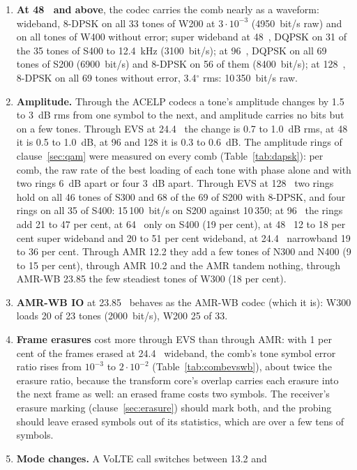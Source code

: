 \begin{enumerate}[label=\alph*)]
  band).
\item \textbf{At 48~\kbs{} and above}, the codec carries the comb
  nearly as a waveform: wideband, 8-DPSK on all 33 tones of W200 at
  $3 \cdot 10^{-3}$ (4950~bit/s raw) and on all tones of W400 without
  error; super wideband at 48~\kbs{}, DQPSK on 31 of the 35 tones of S400
  to 12.4~kHz (3100~bit/s); at 96~\kbs{}, DQPSK on all 69 tones of S200
  (6900~bit/s) and 8-DPSK on 56 of them (8400~bit/s); at 128~\kbs{},
  8-DPSK on all 69 tones without error, 3.4$^\circ$ rms: 10\,350~bit/s raw.
\item \textbf{Amplitude.}  Through the ACELP codecs a tone's amplitude
  changes by 1.5 to 3~dB rms from one symbol to the next, and amplitude
  carries no bits but on a few tones.  Through EVS at 24.4~\kbs{} the
  change is 0.7 to 1.0~dB rms, at 48 it is 0.5 to 1.0~dB, at 96 and 128
  it is 0.3 to 0.6~dB.  The amplitude rings of clause~\ref{sec:qam} were
  measured on every comb (Table~\ref{tab:dapsk}): per comb, the raw rate
  of the best loading of each tone with phase alone and with two rings
  6~dB apart or four 3~dB apart.  Through EVS at 128~\kbs{} two rings
  hold on all 46 tones of S300 and 68 of the 69 of S200 with 8-DPSK, and
  four rings on all 35 of S400: 15\,100~bit/s on S200 against 10\,350;
  at 96~\kbs{} the rings add 21 to 47 per cent, at 64~\kbs{} only on
  S400 (19 per cent), at 48~\kbs{} 12 to 18 per cent super wideband and
  20 to 51 per cent wideband, at 24.4~\kbs{} narrowband 19 to 36 per
  cent.  Through AMR 12.2 they add a few tones of N300 and N400 (9 to 15 per
  cent), through AMR 10.2 and the AMR tandem nothing, through AMR-WB
  23.85 the few steadiest tones of W300 (18 per cent).
\item \textbf{AMR-WB IO} at 23.85~\kbs{} behaves as the AMR-WB codec
  (which it is): W300 loads 20 of 23 tones (2000~bit/s), W200 25 of 33.
\item \textbf{Frame erasures} cost more through EVS than through AMR:
  with 1 per cent of the frames erased at 24.4~\kbs{} wideband, the
  comb's tone symbol error ratio rises from $10^{-3}$ to $2 \cdot 10^{-2}$
  (Table~\ref{tab:combevswb}), about twice the erasure ratio, because the
  transform core's overlap carries each erasure into the next frame as
  well: an erased frame costs two symbols.  The receiver's erasure
  marking (clause~\ref{sec:erasure}) should mark both, and the probing
  should leave erased symbols out of its statistics, which are over a
  few tens of symbols.
\item \textbf{Mode changes.}  A VoLTE call switches between 13.2 and

\end{enumerate}
